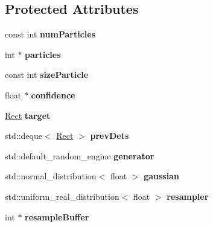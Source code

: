 \subsection*{Protected Attributes}
\begin{DoxyCompactItemize}
\item 
\hypertarget{classParticleFilter_a76cca3c44c00837d85751bb913280361}{}const int {\bfseries num\+Particles}\label{classParticleFilter_a76cca3c44c00837d85751bb913280361}

\item 
\hypertarget{classParticleFilter_a0175a0c46621095d013e8fc539b94eed}{}int $\ast$ {\bfseries particles}\label{classParticleFilter_a0175a0c46621095d013e8fc539b94eed}

\item 
\hypertarget{classParticleFilter_affbf0bd98b03f8c047db2106c40ecfd1}{}const int {\bfseries size\+Particle}\label{classParticleFilter_affbf0bd98b03f8c047db2106c40ecfd1}

\item 
\hypertarget{classParticleFilter_a68e04e60c13a06afc10bcce6b4d056b6}{}float $\ast$ {\bfseries confidence}\label{classParticleFilter_a68e04e60c13a06afc10bcce6b4d056b6}

\item 
\hypertarget{classParticleFilter_aa97f15d13d905348953cdc3122871255}{}\hyperlink{classRect}{Rect} {\bfseries target}\label{classParticleFilter_aa97f15d13d905348953cdc3122871255}

\item 
\hypertarget{classParticleFilter_af4d929abf5b5189a235df44e52a20d34}{}std\+::deque$<$ \hyperlink{classRect}{Rect} $>$ {\bfseries prev\+Dets}\label{classParticleFilter_af4d929abf5b5189a235df44e52a20d34}

\item 
\hypertarget{classParticleFilter_a10b276ac5acdc39a1c7f5fc89dc9529d}{}std\+::default\+\_\+random\+\_\+engine {\bfseries generator}\label{classParticleFilter_a10b276ac5acdc39a1c7f5fc89dc9529d}

\item 
\hypertarget{classParticleFilter_a861497b4329e28e078d7ebfa381baae9}{}std\+::normal\+\_\+distribution$<$ float $>$ {\bfseries gaussian}\label{classParticleFilter_a861497b4329e28e078d7ebfa381baae9}

\item 
\hypertarget{classParticleFilter_aa6149560d37c102c0e96b2b0cd9b696b}{}std\+::uniform\+\_\+real\+\_\+distribution$<$ float $>$ {\bfseries resampler}\label{classParticleFilter_aa6149560d37c102c0e96b2b0cd9b696b}

\item 
\hypertarget{classParticleFilter_a23a3c5e7016d74cf775031b612c19839}{}int $\ast$ {\bfseries resample\+Buffer}\label{classParticleFilter_a23a3c5e7016d74cf775031b612c19839}

\end{DoxyCompactItemize}


